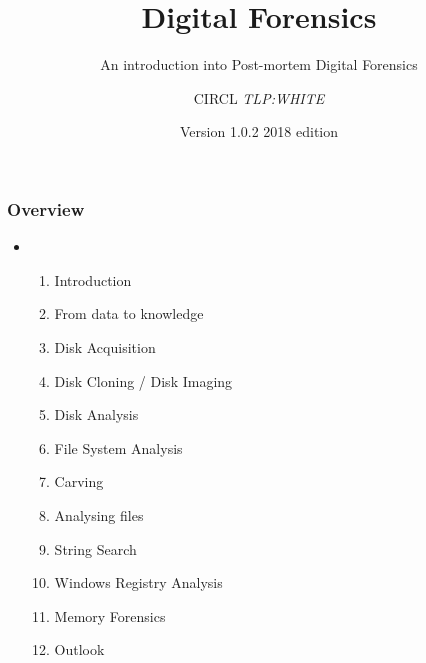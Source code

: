 \documentclass{beamer}
\author{CIRCL \emph{TLP:WHITE}}
\title{Digital Forensics}
\subtitle{An introduction into Post-mortem Digital Forensics}
\institute{info@circl.lu}
\date{Version 1.0.2 2018 edition}
\begin{document}
\begin{frame}[t,plain]
\titlepage
\end{frame}

\begin{frame}
  \frametitle{Overview}
  \begin{itemize}
  \item[]
      \begin{enumerate}
          \item Introduction
          \item From data to knowledge
          \item Disk Acquisition
          \item Disk Cloning / Disk Imaging
          \item Disk Analysis
          \item File System Analysis
          \item Carving
          \item Analysing files
          \item String Search
          \item Windows Registry Analysis
          \item Memory Forensics
          \item Outlook
      \end{enumerate}
  \end{itemize}
\end{frame}















\end{document}
